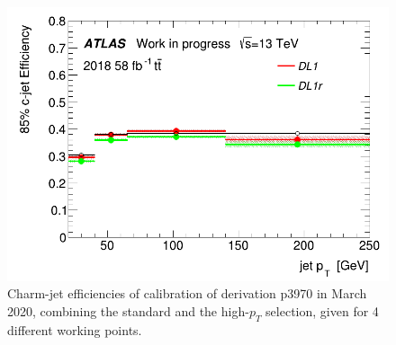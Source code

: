 \documentclass[letterpaper,12pt]{article}
\begin{document}
\begin{figure}[H]
\begin{minipage}[b]{.45\textwidth}
\end{minipage}\hfill
\begin{minipage}[b]{.45\textwidth}
\centering
\includegraphics[width=1\textwidth]{March_highpT/eff85.png}
\end{minipage}
\caption{Charm-jet efficiencies of calibration of derivation p3970 in March 2020, combining the standard and the high-$p_{T}$ selection, given for  4 different working points.} \label{fig:March_highpT_eff}
\end{figure}
\end{document}
